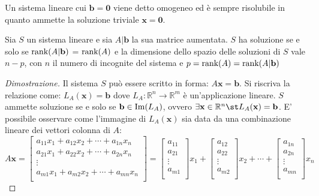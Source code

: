     Un sistema lineare cui $\mathbf{b} = \mathbf{0}$ viene detto omogeneo ed è sempre risolubile in quanto ammette la soluzione triviale $\mathbf{x} = \mathbf{0}$.

    \vspace{10pt}
    \begin{theorem}
        Sia $S$ un sistema lineare e sia $A | \mathbf{b}$ la sua matrice aumentata. $S$ ha soluzione se e solo se
        $\textnormal{rank}(A | \mathbf{b})$ = $\textnormal{rank}(A)$ e la dimensione dello spazio delle soluzioni di $S$ vale $n - p$,
        con $n$ il numero di incognite del sistema e $p = \textnormal{rank}(A) = \textnormal{rank}(A | \mathbf{b})$
    \end{theorem}

    \begin{proof}[Dimostrazione]
        Il sistema $S$ può essere scritto in forma: $A\mathbf{x} = \mathbf{b}$. Si riscriva la relazione come: $L_A(\mathbf{x}) = \mathbf{b}$ dove $L_A: \mathbb{R}^n \rightarrow \mathbb{R}^m$ è un'applicazione lineare.
        $S$ ammette soluzione se e solo se $\mathbf{b} \in \textnormal{Im}(L_A)$, ovvero $\exists \mathbf{x} \in \mathbb{R}^n \st L_A(\mathbf{x}) = \mathbf{b}$. E' possibile osservare come l'immagine di $L_A(\mathbf{x})$
        sia data da una combinazione lineare dei vettori colonna di $A$:
        \[
            A\mathbf{x} =
            \begin{bmatrix}
                a_{11}x_{1} + a_{12}x_{2} + \cdots + a_{1n}x_{n} \\
                a_{21}x_{1} + a_{22}x_{2} + \cdots + a_{2n}x_{n} \\
                \vdots \\
                a_{m1}x_{1} + a_{m2}x_{2} + \cdots + a_{mn}x_{n} \\
            \end{bmatrix}
            =
            \begin{bmatrix}
                a_{11} \\
                a_{21} \\
                \vdots \\
                a_{m1} \\
            \end{bmatrix}
            x_{1}
            +
            \begin{bmatrix}
                a_{12} \\
                a_{22} \\
                \vdots \\
                a_{m2} \\
            \end{bmatrix}
            x_{2}
            +
            \cdots
            +
            \begin{bmatrix}
                a_{1n} \\
                a_{2n} \\
                \vdots \\
                a_{mn} \\
            \end{bmatrix}
            x_{n}
        \]


\end{proof}
